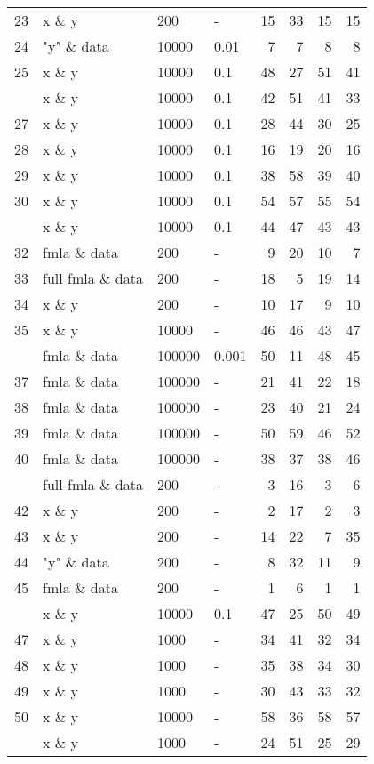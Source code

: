 \begin{Schunk}
\begin{table}
\begin{tabular}[t]{rlllrrrr}
23 & x \& y & 200 & - & 15 & 33 & 15 & 15\\
24 & "y" \& data & 10000 & 0.01 & 7 & 7 & 8 & 8\\
25 & x \& y & 10000 & 0.1 & 48 & 27 & 51 & 41\\
\addlinespace
26 & x \& y & 10000 & 0.1 & 42 & 51 & 41 & 33\\
27 & x \& y & 10000 & 0.1 & 28 & 44 & 30 & 25\\
28 & x \& y & 10000 & 0.1 & 16 & 19 & 20 & 16\\
29 & x \& y & 10000 & 0.1 & 38 & 58 & 39 & 40\\
30 & x \& y & 10000 & 0.1 & 54 & 57 & 55 & 54\\
\addlinespace
31 & x \& y & 10000 & 0.1 & 44 & 47 & 43 & 43\\
32 & fmla \& data & 200 & - & 9 & 20 & 10 & 7\\
33 & full fmla \& data & 200 & - & 18 & 5 & 19 & 14\\
34 & x \& y & 200 & - & 10 & 17 & 9 & 10\\
35 & x \& y & 10000 & - & 46 & 46 & 43 & 47\\
\addlinespace
36 & fmla \& data & 100000 & 0.001 & 50 & 11 & 48 & 45\\
37 & fmla \& data & 100000 & - & 21 & 41 & 22 & 18\\
38 & fmla \& data & 100000 & - & 23 & 40 & 21 & 24\\
39 & fmla \& data & 100000 & - & 50 & 59 & 46 & 52\\
40 & fmla \& data & 100000 & - & 38 & 37 & 38 & 46\\
\addlinespace
41 & full fmla \& data & 200 & - & 3 & 16 & 3 & 6\\
42 & x \& y & 200 & - & 2 & 17 & 2 & 3\\
43 & x \& y & 200 & - & 14 & 22 & 7 & 35\\
44 & "y" \& data & 200 & - & 8 & 32 & 11 & 9\\
45 & fmla \& data & 200 & - & 1 & 6 & 1 & 1\\
\addlinespace
46 & x \& y & 10000 & 0.1 & 47 & 25 & 50 & 49\\
47 & x \& y & 1000 & - & 34 & 41 & 32 & 34\\
48 & x \& y & 1000 & - & 35 & 38 & 34 & 30\\
49 & x \& y & 1000 & - & 30 & 43 & 33 & 32\\
50 & x \& y & 10000 & - & 58 & 36 & 58 & 57\\
\addlinespace
51 & x \& y & 1000 & - & 24 & 51 & 25 & 29\\

\end{tabular}
\end{table}
\end{Schunk}
